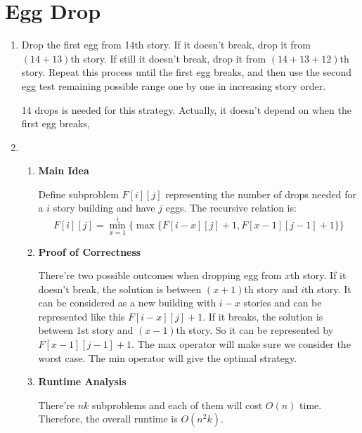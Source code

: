 \documentclass[11pt]{article}
\newenvironment{qparts}{\begin{enumerate}[{(}a{)}]}{\end{enumerate}}
\begin{document}
\section{Egg Drop}
\begin{qparts}
	\item 
	
	Drop the first egg from 14th story. If it doesn't break, drop it from $(14 + 13)$th story. If still it doesn't break, drop it from $(14 + 13 + 12)$th story. Repeat this process until the first egg breaks, and then use the second egg test remaining possible range one by one in increasing story order.
	
	14 drops is needed for this strategy. Actually, it doesn't depend on when the first egg breaks, 
	
	\item
	
	\renewcommand{\theenumii}{\roman{enumii}}
	\begin{enumerate}
		\item \textbf{Main Idea}
		
		Define subproblem $F[i][j]$ representing the number of drops needed for a $i$ story building and have $j$ eggs.
		The recursive relation is:		
		\[
			F[i][j] = \min_{x = 1}^{i}\{ \max\{ F[i - x][j] + 1 , F[x-1][j-1] + 1 \} \}
		\]
		
		\item \textbf{Proof of Correctness}
		
		There're two possible outcomes when dropping egg from $x$th story. If it doesn't break, the solution is between $(x+1)$th story and $i$th story. It can be considered as a new building with $i-x$ stories and can be represented like this $F[i - x][j] + 1$. If it breaks, the solution is between $1$st story and $(x-1)$th story. So it can be represented by $F[x-1][j-1] + 1$. The max operator will make sure we consider the worst case. The min operator will give the optimal strategy.
		
		\item \textbf{Runtime Analysis}
		
		There're $nk$ subproblems and each of them will cost $O(n)$ time. Therefore, the overall runtime is $O(n^2k)$.
	
	\end{enumerate}

\end{qparts}


\newpage
\end{document}
